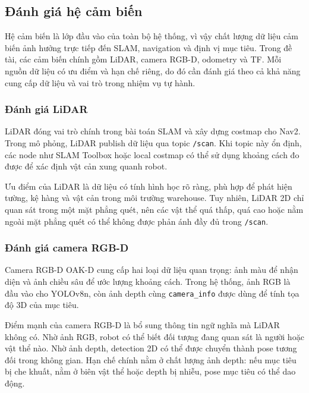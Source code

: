\subsection{Đánh giá hệ cảm biến}
\label{subsec:sensor-evaluation}

Hệ cảm biến là lớp đầu vào của toàn bộ hệ thống, vì vậy chất lượng dữ liệu cảm biến ảnh hưởng trực tiếp đến SLAM, navigation và định vị mục tiêu. Trong đề tài, các cảm biến chính gồm LiDAR, camera RGB-D, odometry và TF. Mỗi nguồn dữ liệu có ưu điểm và hạn chế riêng, do đó cần đánh giá theo cả khả năng cung cấp dữ liệu và vai trò trong nhiệm vụ tự hành.

\subsubsection{Đánh giá LiDAR}
\label{subsubsec:lidar-evaluation}

LiDAR đóng vai trò chính trong bài toán SLAM và xây dựng costmap cho Nav2. Trong mô phỏng, LiDAR publish dữ liệu qua topic \texttt{/scan}. Khi topic này ổn định, các node như SLAM Toolbox hoặc local costmap có thể sử dụng khoảng cách đo được để xác định vật cản xung quanh robot.

Ưu điểm của LiDAR là dữ liệu có tính hình học rõ ràng, phù hợp để phát hiện tường, kệ hàng và vật cản trong môi trường warehouse. Tuy nhiên, LiDAR 2D chỉ quan sát trong một mặt phẳng quét, nên các vật thể quá thấp, quá cao hoặc nằm ngoài mặt phẳng quét có thể không được phản ánh đầy đủ trong \texttt{/scan}.

\subsubsection{Đánh giá camera RGB-D}
\label{subsubsec:rgbd-camera-evaluation}

Camera RGB-D OAK-D cung cấp hai loại dữ liệu quan trọng: ảnh màu để nhận diện và ảnh chiều sâu để ước lượng khoảng cách. Trong hệ thống, ảnh RGB là đầu vào cho YOLOv8n, còn ảnh depth cùng \texttt{camera\_info} được dùng để tính tọa độ 3D của mục tiêu.

Điểm mạnh của camera RGB-D là bổ sung thông tin ngữ nghĩa mà LiDAR không có. Nhờ ảnh RGB, robot có thể biết đối tượng đang quan sát là người hoặc vật thể nào. Nhờ ảnh depth, detection 2D có thể được chuyển thành pose tương đối trong không gian. Hạn chế chính nằm ở chất lượng ảnh depth: nếu mục tiêu bị che khuất, nằm ở biên vật thể hoặc depth bị nhiễu, pose mục tiêu có thể dao động.

